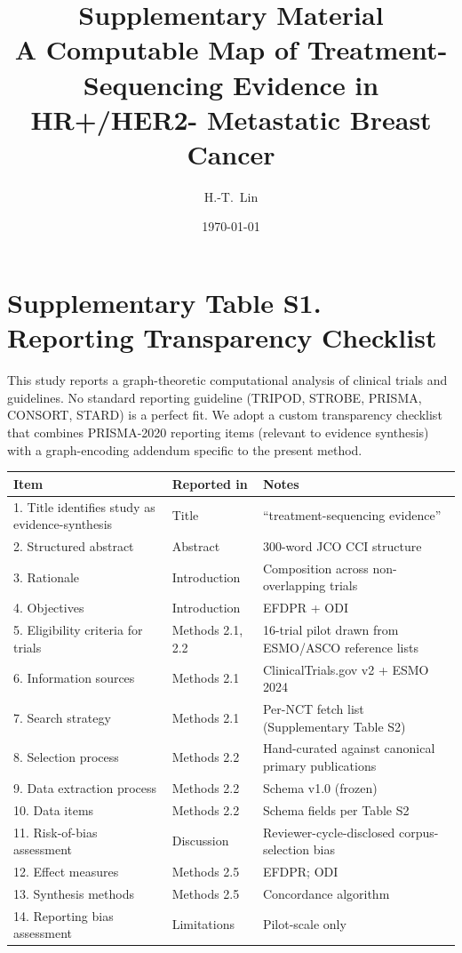 \documentclass[11pt,a4paper]{article}
\title{\textbf{Supplementary Material} \\
A Computable Map of Treatment-Sequencing Evidence in HR+/HER2- Metastatic Breast Cancer}
\author{H.-T.\ Lin}
\date{\today}
\begin{document}
\maketitle

\section*{Supplementary Table S1. Reporting Transparency Checklist}
\noindent
This study reports a graph-theoretic computational analysis of clinical trials
and guidelines. No standard reporting guideline (TRIPOD, STROBE, PRISMA, CONSORT,
STARD) is a perfect fit. We adopt a custom transparency checklist that combines
PRISMA-2020 reporting items (relevant to evidence synthesis) with a graph-encoding
addendum specific to the present method.

\begin{longtable}{p{5.6cm}p{3.0cm}p{6.0cm}}
\toprule
\textbf{Item} & \textbf{Reported in} & \textbf{Notes} \\
\midrule
\endhead
1. Title identifies study as evidence-synthesis & Title & ``treatment-sequencing evidence'' \\
2. Structured abstract & Abstract & 300-word JCO CCI structure \\
3. Rationale & Introduction & Composition across non-overlapping trials \\
4. Objectives & Introduction & EFDPR + ODI \\
5. Eligibility criteria for trials & Methods 2.1, 2.2 & 16-trial pilot drawn from ESMO/ASCO reference lists \\
6. Information sources & Methods 2.1 & ClinicalTrials.gov v2 + ESMO 2024 \\
7. Search strategy & Methods 2.1 & Per-NCT fetch list (Supplementary Table S2) \\
8. Selection process & Methods 2.2 & Hand-curated against canonical primary publications \\
9. Data extraction process & Methods 2.2 & Schema v1.0 (frozen) \\
10. Data items & Methods 2.2 & Schema fields per Table S2 \\
11. Risk-of-bias assessment & Discussion & Reviewer-cycle-disclosed corpus-selection bias \\
12. Effect measures & Methods 2.5 & EFDPR; ODI \\
13. Synthesis methods & Methods 2.5 & Concordance algorithm \\
14. Reporting bias assessment & Limitations & Pilot-scale only \\

\end{longtable}
\end{document}
